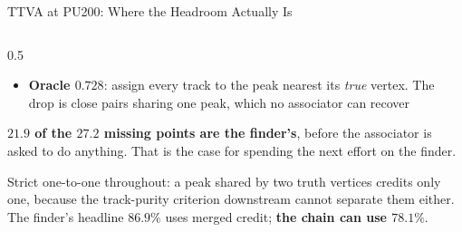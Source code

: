\documentclass[xcolor=table,aspectratio=169]{beamer}
\newcommand{\ntrk}{\ensuremath{n_\mathrm{trk}}}
\begin{document}
\begin{frame}[shrink=20]{TTVA at PU200: Where the Headroom Actually Is}
\begin{columns}[c]
\begin{column}{0.5\linewidth}
\begin{itemize}
                    \(\ntrk{=}3\) against 7)
                \item \textbf{Oracle $0.728$}: assign every track to the peak nearest
                    its \emph{true} vertex. The drop is close pairs sharing one peak,
                    which no associator can recover
            \end{itemize}
            \vspace{0.3em}
            \textcolor{pennred}{\textbf{$\mathbf{21.9}$ of the $\mathbf{27.2}$ missing
            points are the finder's}}, before the associator is asked to do anything.
            That is the case for spending the next effort on the finder.
            \vspace{0.2em}

            \vspace{0.2em}
            {\scriptsize\textcolor{black!55}{Strict one-to-one throughout: a peak
            shared by two truth vertices credits only one, because the track-purity
            criterion downstream cannot separate them either. The finder's headline
            $86.9\%$ uses merged credit; \textbf{the chain can use $78.1\%$}.}}
        \end{column}
    \end{columns}
\end{frame}
\end{document}
